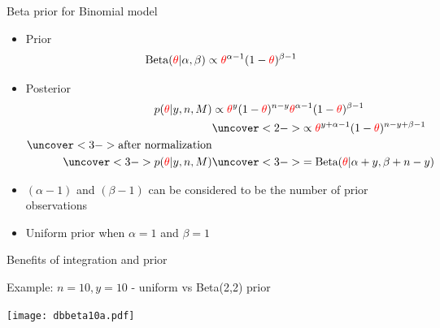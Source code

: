 \documentclass[english,t]{beamer}
\begin{document}
\begin{frame}{Beta prior for Binomial model}

  \begin{itemize}
  \item Prior \baselineskip
    \begin{align*}
      \text{Beta}({\color{red} \theta}|\alpha,\beta) \propto {\color{red} \theta}^{\alpha-1}
      (1-{\color{red} \theta})^{\beta-1}
    \end{align*}
  \item Posterior
    \baselineskip
    \begin{align*}
      p({\color{red} \theta}|y,n,M) & \propto {\color{red} \theta}^y(1-{\color{red} \theta})^{n-y}
                                      {\color{red} \theta}^{\alpha-1} (1-{\color{red} \theta})^{\beta-1}\\
                                    &\uncover<2->{ \propto
                                      {\color{red} \theta}^{y+\alpha-1} (1-{\color{red} \theta})^{n-y+\beta-1}}\\
      \uncover<3->{\text{after normalization}} &\\
      \uncover<3->{p({\color{red} \theta}|y,n,M)}
                                    &\uncover<3->{ = \text{Beta}({\color{red} \theta}|\alpha+y,\beta+n-y)}
    \end{align*}
    \vskip -2mm
  \item<4-> $(\alpha-1)$ and $(\beta-1)$ can be considered to be the
    number of prior observations
  \item<4-> Uniform prior when $\alpha=1$ and $\beta=1$ 
  \end{itemize}
\end{frame}



\begin{frame}{Benefits of integration and prior}

  \vspace{-0.5\baselineskip}
  Example: $n=10, y=10$ - uniform vs Beta(2,2) prior
  \begin{center}
    \texttt{[image: dbbeta10a.pdf]}\\
  \end{center}

\end{frame}
\end{document}
